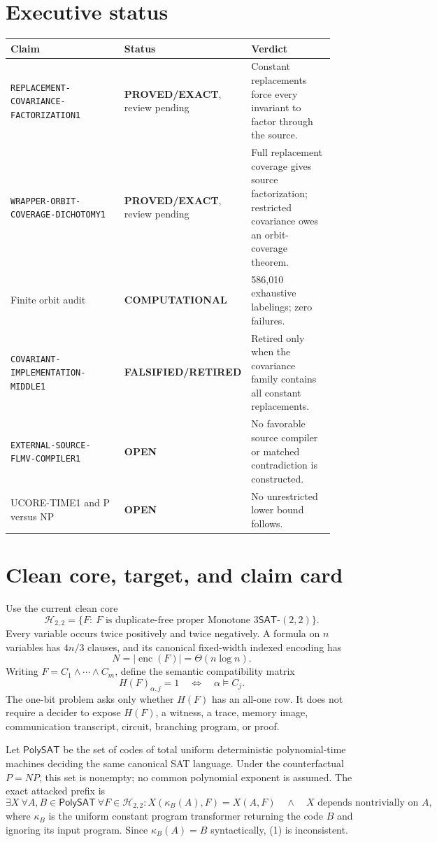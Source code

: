 \documentclass[11pt]{article}
\newcommand{\SAT}{\mathsf{SAT}}
\newcommand{\PolySAT}{\mathsf{PolySAT}}
\newcommand{\EXACT}{\textbf{PROVED/EXACT}}
\newcommand{\OPEN}{\textbf{OPEN}}
\newcommand{\RETIRED}{\textbf{FALSIFIED/RETIRED}}
\newcommand{\COMP}{\textbf{COMPUTATIONAL}}
\begin{document}
\section{Executive status}
\begin{center}\small
\begin{tabular}{@{}p{0.43\linewidth}p{0.19\linewidth}p{0.30\linewidth}@{}}
\toprule
Claim & Status & Verdict\\ \midrule
\texttt{REPLACEMENT-COVARIANCE-FACTORIZATION1} & \EXACT, review pending &
Constant replacements force every invariant to factor through the source.\\
\texttt{WRAPPER-ORBIT-COVERAGE-DICHOTOMY1} & \EXACT, review pending &
Full replacement coverage gives source factorization; restricted covariance owes an orbit-coverage theorem.\\
Finite orbit audit & \COMP & 586,010 exhaustive labelings; zero failures.\\
\texttt{COVARIANT-IMPLEMENTATION-MIDDLE1} & \RETIRED &
Retired only when the covariance family contains all constant replacements.\\
\texttt{EXTERNAL-SOURCE-FLMV-COMPILER1} & \OPEN &
No favorable source compiler or matched contradiction is constructed.\\
UCORE-TIME1 and P versus NP & \OPEN & No unrestricted lower bound follows.\\
\bottomrule
\end{tabular}
\end{center}

\section{Clean core, target, and claim card}
Use the current clean core
\[
 \mathcal H_{2,2}=\{F:\ F\text{ is duplicate-free proper Monotone }
 3\SAT\text{-}(2,2)\}.
\]
Every variable occurs twice positively and twice negatively. A formula on
\(n\) variables has \(4n/3\) clauses, and its canonical fixed-width indexed
encoding has
\[
 N=|\operatorname{enc}(F)|=\Theta(n\log n).
\]
Writing \(F=C_1\wedge\cdots\wedge C_m\), define the semantic compatibility
matrix
\[
 H(F)_{\alpha,j}=1\quad\Longleftrightarrow\quad\alpha\models C_j.
\]
The one-bit problem asks only whether \(H(F)\) has an all-one row. It does
not require a decider to expose \(H(F)\), a witness, a trace, memory image,
communication transcript, circuit, branching program, or proof.

Let \(\PolySAT\) be the set of codes of total uniform deterministic
polynomial-time machines deciding the same canonical SAT language. Under
the counterfactual \(P=NP\), this set is nonempty; no common polynomial
exponent is assumed. The exact attacked prefix is
\[
 \exists X\ \forall A,B\in\PolySAT\ \forall F\in\mathcal H_{2,2}:
 X(\kappa_B(A),F)=X(A,F)
 \quad\land\quad X\text{ depends nontrivially on }A,
 \tag{1}
\]
where \(\kappa_B\) is the uniform constant program transformer returning
the code \(B\) and ignoring its input program. Since
\(\kappa_B(A)=B\) syntactically, (1) is inconsistent.
\end{document}
